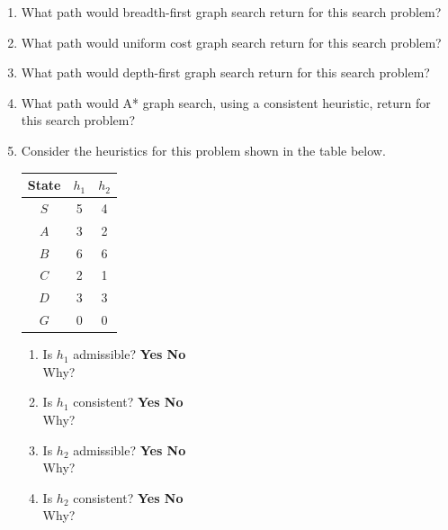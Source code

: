 \begin{enumerate}
  \item What path would breadth-first graph search return for this search problem?

\vspace{1cm}

  \item What path would uniform cost graph search return for this search problem?

\vspace{1cm}

  \item What path would depth-first graph search return for this search problem?

\vspace{1cm}

  \item What path would A* graph search, using a consistent heuristic, return for this search problem?

  \newpage

  \item Consider the heuristics for this problem shown in the table below.
  \begin{center}
  \begin{tabular}{|c|c|c|}
    \hline
    State & $h_1$ & $h_2$\\
    \hline
    $S$ & 5 & 4 \\
    \hline
    $A$ & 3 & 2 \\
    \hline
    $B$ & 6 & 6 \\
    \hline
    $C$ & 2 & 1 \\
    \hline
    $D$ & 3 & 3 \\
    \hline
    $G$ & 0 & 0 \\
    \hline
  \end{tabular}
  \end{center}
  \begin{enumerate}
      \item Is $h_1$ admissible? \textbf{Yes \hspace{5pt} No}\\
      Why?
      \vspace{2cm}

      \item Is $h_1$ consistent? \textbf{Yes \hspace{5pt} No}\\
      Why?
      \vspace{2cm}

      \item Is $h_2$ admissible? \textbf{Yes \hspace{5pt} No}\\
      Why?
      \vspace{2cm}

      \item Is $h_2$ consistent? \textbf{Yes \hspace{5pt} No}\\
      Why?
      \vspace{2cm}

  \end{enumerate}


\end{enumerate}
